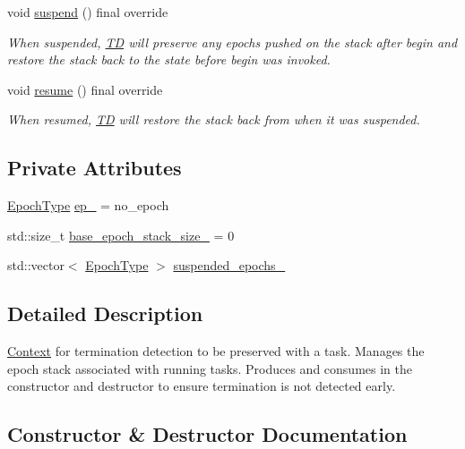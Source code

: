 \begin{DoxyCompactItemize}
void \hyperlink{structvt_1_1ctx_1_1_t_d_aa0a190994d71eda5321da08464a810a9}{suspend} () final override
\begin{DoxyCompactList}\small\item\em When suspended, {\ttfamily \hyperlink{structvt_1_1ctx_1_1_t_d}{TD}} will preserve any epochs pushed on the stack after begin and restore the stack back to the state before begin was invoked. \end{DoxyCompactList}\item 
void \hyperlink{structvt_1_1ctx_1_1_t_d_aa21b5afe01312244e338eefecde83bc6}{resume} () final override
\begin{DoxyCompactList}\small\item\em When resumed, {\ttfamily \hyperlink{structvt_1_1ctx_1_1_t_d}{TD}} will restore the stack back from when it was suspended. \end{DoxyCompactList}\end{DoxyCompactItemize}
\subsection*{Private Attributes}
\begin{DoxyCompactItemize}
\item 
\hyperlink{namespacevt_a985a5adf291c34a3ca263b3378388236}{Epoch\+Type} \hyperlink{structvt_1_1ctx_1_1_t_d_a27c1d8888dd9b0fcc0b6a8f31f7ebdb7}{ep\+\_\+} = no\+\_\+epoch
\item 
std\+::size\+\_\+t \hyperlink{structvt_1_1ctx_1_1_t_d_ae63dbf338735e6ffd69ae2d67a24e3fb}{base\+\_\+epoch\+\_\+stack\+\_\+size\+\_\+} = 0
\item 
std\+::vector$<$ \hyperlink{namespacevt_a985a5adf291c34a3ca263b3378388236}{Epoch\+Type} $>$ \hyperlink{structvt_1_1ctx_1_1_t_d_aa960a5f0ddf7725eb720d8bc68f1325f}{suspended\+\_\+epochs\+\_\+}
\end{DoxyCompactItemize}


\subsection{Detailed Description}
\hyperlink{structvt_1_1ctx_1_1_context}{Context} for termination detection to be preserved with a task. Manages the epoch stack associated with running tasks. Produces and consumes in the constructor and destructor to ensure termination is not detected early. 

\subsection{Constructor \& Destructor Documentation}
\mbox{\label{structvt_1_1ctx_1_1_t_d_ade8d2b390d1b4a484dd9f5f20546bc91}} 
